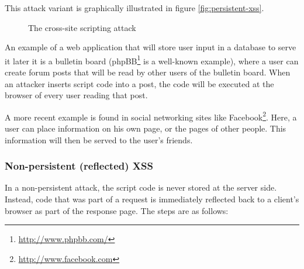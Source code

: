 This attack variant is graphically illustrated in figure \ref{fig:persistent-xss}.

\begin{figure}[ht]
	\centering
	\caption{The cross-site scripting attack}
\end{figure}

An example of a web application that will store user input in a database to serve it later it is a bulletin board (phpBB\footnote{\url{http://www.phpbb.com/}} is a well-known example), where a user can create forum posts that will be read by other users of the bulletin board. When an attacker inserts script code into a post, the code will be executed at the browser of every user reading that post.

A more recent example is found in social networking sites like Facebook\footnote{\url{http://www.facebook.com}}. Here, a user can place information on his own page, or the pages of other people. This information will then be served to the user's friends.

\subsubsection{Non-persistent (reflected) XSS}
In a non-persistent attack, the script code is never stored at the server side. Instead, code that was part of a request is immediately reflected back to a client's browser as part of the response page. The steps are as follows:

